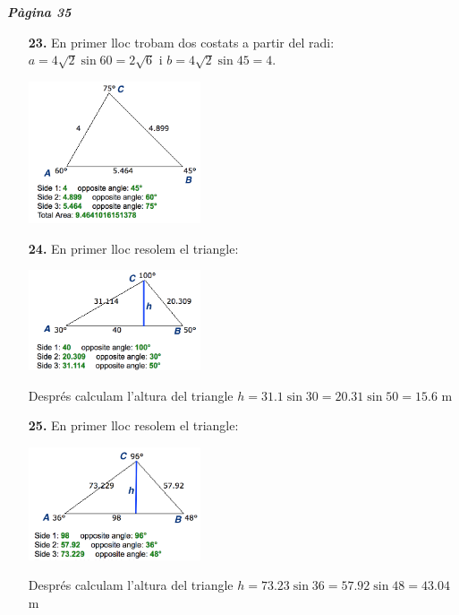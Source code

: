 \documentclass[a4paper, pdf, twoside]{book}
\begin{document}
\begin{multicols}{2}
{\textbf{\em Pàgina 35}} \hrulefill
\begin{enumerate}
\vspace{0.25cm}
\item[\fontfamily{phv}\selectfont\color{blue}\textbf{23. }] 
En primer lloc trobam dos costats a partir del radi: $a=4\sqrt {2}\sin 60=2\sqrt {6}$ i $b=4\sqrt {2} \sin 45 = 4$.\par \includegraphics [width=0.4\textwidth ]{img-sol/t3-23}
 \end{enumerate}
\begin{enumerate}
\vspace{0.25cm}
\item[\fontfamily{phv}\selectfont\color{blue}\textbf{24. }] 
En primer lloc resolem el triangle:\par \includegraphics [width=0.4\textwidth ]{img-sol/t3-24}\par Després calculam l'altura del triangle $h=31.1\sin 30=20.31\sin 50=15.6$ m
\vspace{0.25cm}
\item[\fontfamily{phv}\selectfont\color{blue}\textbf{25. }] 
En primer lloc resolem el triangle:\par \includegraphics [width=0.4\textwidth ]{img-sol/t3-25}\par Després calculam l'altura del triangle $h=73.23\sin 36=57.92\sin 48=43.04$ m
\vspace{0.25cm}

\end{enumerate}
\end{multicols}
\end{document}
